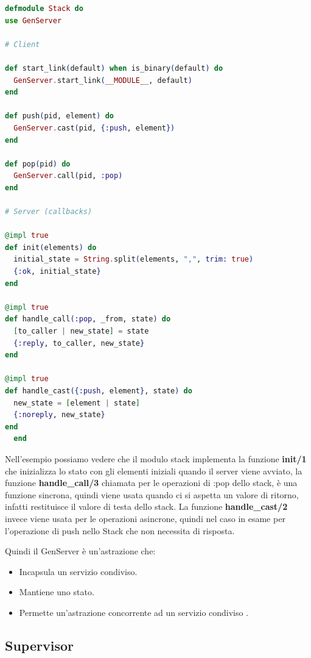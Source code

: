 \begin{lstlisting}[language=elixir, caption={Implementazione Stack},captionpos=b,
	label={lst:stackGenServer}]
defmodule Stack do
use GenServer

# Client

def start_link(default) when is_binary(default) do
  GenServer.start_link(__MODULE__, default)
end

def push(pid, element) do
  GenServer.cast(pid, {:push, element})
end

def pop(pid) do
  GenServer.call(pid, :pop)
end

# Server (callbacks)

@impl true
def init(elements) do
  initial_state = String.split(elements, ",", trim: true)
  {:ok, initial_state}
end

@impl true
def handle_call(:pop, _from, state) do
  [to_caller | new_state] = state
  {:reply, to_caller, new_state}
end

@impl true
def handle_cast({:push, element}, state) do
  new_state = [element | state]
  {:noreply, new_state}
end
  end
\end{lstlisting}

Nell'esempio possiamo vedere che il modulo stack implementa
la funzione \textbf{init/1} che inizializza lo stato con gli elementi
iniziali quando il server viene avviato, la funzione \textbf{handle\_call/3}
chiamata per le operazioni di :pop dello stack,
è una funzione sincrona, quindi viene usata quando ci si aspetta
un valore di ritorno, infatti restituisce il valore di
testa dello stack. La funzione \textbf{handle\_cast/2} invece viene usata per
le operazioni asincrone, quindi nel caso in esame per l'operazione di
push nello Stack che non necessita di risposta.

Quindi il GenServer è un'astrazione che:

\begin{itemize}
	\item Incapsula un servizio condiviso.
	\item Mantiene uno stato.
	\item Permette un'astrazione concorrente ad un servizio condiviso \cite{adoptingElixirchap5pag96}.
\end{itemize}


\subsection{Supervisor}

